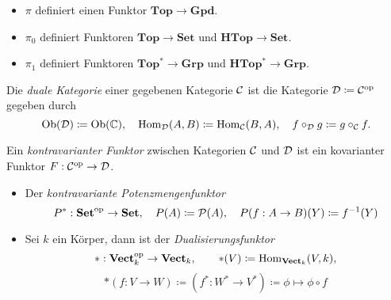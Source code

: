 \documentclass{cheat-sheet}
\newcommand{\Pow}{\mathcal{P}} %
\begin{document}
\begin{bem}
  \begin{itemize}
    \item $\pi$ definiert einen Funktor $\mathbf{Top} \to \mathbf{Gpd}$.
    \item $\pi_0$ definiert Funktoren $\mathbf{Top} \to \mathbf{Set}$ und $\mathbf{HTop} \to \mathbf{Set}$.
    \item $\pi_1$ definiert Funktoren $\mathbf{Top^*} \to \mathbf{Grp}$ und $\mathbf{HTop^*} \to \mathbf{Grp}$.
  \end{itemize}
\end{bem}

\begin{defn}
  Die \emph{duale Kategorie} einer gegebenen Kategorie $\mathcal{C}$ ist die Kategorie $\mathcal{D} \coloneqq \mathcal{C}^{\mathrm{op}}$ gegeben durch
  \[
    \operatorname{Ob}(\mathcal{D}) \coloneqq \operatorname{Ob}(\mathbb{C}), \quad
    \operatorname{Hom}_{\mathcal{D}}(A, B) \coloneqq \operatorname{Hom}_{\mathcal{C}}(B, A), \quad
    f \circ_{\mathcal{D}} g \coloneqq g \circ_{\mathcal{C}} f.
  \]
\end{defn}

\begin{defn}
  Ein \emph{kontravarianter Funktor} zwischen Kategorien $\mathcal{C}$ und $\mathcal{D}$ ist ein kovarianter Funktor $F : \mathcal{C}^{\mathrm{op}} \to \mathcal{D}$.
\end{defn}

\begin{bspe}
  \begin{itemize}
    \item Der \emph{kontravariante Potenzmengenfunktor}
    \[
      P^* : \mathbf{Set}^\op \to \mathbf{Set}, \quad
      P(A) \coloneqq \Pow(A), \quad
      P(f : A \to B)(Y) \coloneqq f^{-1}(Y)
    \]
    \item Sei $k$ ein Körper, dann ist der \emph{Dualisierungsfunktor}
    \[
      * : \mathbf{Vect}_k^{\mathrm{op}} \to \mathbf{Vect}_k, \qquad *(V) \coloneqq \operatorname{Hom}_{\mathbf{Vect}_k}(V, k),
    \]
    \[
      *(f : V \to W) \coloneqq (f^* : W^* \to V^*) \coloneqq \phi \mapsto \phi \circ f
    \]
  \end{itemize}
\end{bspe}
\end{document}
